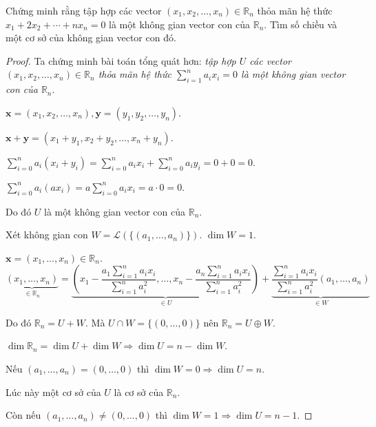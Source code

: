 \documentclass[class=linearalgebra,crop=false]{standalone}
\begin{document}
\begin{exercise}Chứng minh rằng tập hợp các vector $(x_{1}, x_{2}, \ldots, x_{n})\in\mathbb{R}_{n}$ thỏa mãn hệ thức $x_{1} + 2x_{2} + \cdots + nx_{n} = 0$ là một không gian vector con của $\mathbb{R}_{n}$. Tìm số chiều và một cơ sở của không gian vector con đó.
\end{exercise}

\begin{proof}Ta chứng minh bài toán tổng quát hơn: \textit{tập hợp $U$ các vector $(x_{1}, x_{2}, \ldots, x_{n})\in\mathbb{R}_{n}$ thỏa mãn hệ thức $\displaystyle\sum^{n}_{i=1}a_{i}x_{i} = 0$ là một không gian vector con của $\mathbb{R}_{n}$}.
    \par $\mathbf{x} = (x_{1}, x_{2}, \ldots, x_{n}), \mathbf{y} = (y_{1}, y_{2}, \ldots, y_{n})$.
    \par $\mathbf{x} + \mathbf{y} = (x_{1} + y_{1}, x_{2} + y_{2}, \ldots, x_{n} + y_{n})$.
    \par $\displaystyle\sum^{n}_{i=0}a_{i}(x_{i} + y_{i}) = \displaystyle\sum^{n}_{i=0}a_{i}x_{i} + \displaystyle\sum^{n}_{i=0}a_{i}y_{i} = 0 + 0 = 0$.
    \par $\displaystyle\sum^{n}_{i=0}a_{i}(ax_{i}) = a\displaystyle\sum^{n}_{i=0}a_{i}x_{i} = a\cdot 0 = 0$.
    \par Do đó $U$ là một không gian vector con của $\mathbb{R}_{n}$.
    \par Xét không gian con $W = \mathcal{L}(\{(a_{1},\ldots, a_{n})\})$. $\dim W = 1$.
    \par $\mathbf{x} = (x_{1}, \ldots, x_{n}) \in \mathbb{R}_{n}$.
    \[
        \underbrace{(x_{1},\ldots, x_{n})}_{\in\mathbb{R}_{n}} = \underbrace{\left(x_{1} - \frac{a_{1}\sum^{n}_{i=1} a_{i}x_{i}}{\sum^{n}_{i=1} a^{2}_{i}},\ldots, x_{n} - \frac{a_{n}\sum^{n}_{i=1}a_{i}x_{i}}{\sum^{n}_{i=1}a^{2}_{i}}\right)}_{\in U} + \underbrace{\frac{\sum^{n}_{i=1}a_{i}x_{i}}{\sum^{n}_{i=1}a^{2}_{i}}(a_{1},\ldots,a_{n})}_{\in W}
    \]
    \par Do đó $\mathbb{R}_{n} = U + W$. Mà $U\cap W = \{ (0,\ldots, 0) \}$ nên $\mathbb{R}_{n} = U\oplus W$.
    \par $\dim\mathbb{R}_{n} = \dim U + \dim W \Rightarrow \dim U = n - \dim W$.
    \par Nếu $(a_{1},\ldots, a_{n}) = (0,\ldots,0)$ thì $\dim W = 0 \Rightarrow \dim U = n$.
    \par Lúc này một cơ sở của $U$ là cơ sở của $\mathbb{R}_{n}$.
    \par Còn nếu $(a_{1},\ldots, a_{n}) \ne (0,\ldots,0)$ thì $\dim W = 1\Rightarrow \dim U = n - 1$.

\end{proof}
\end{document}
